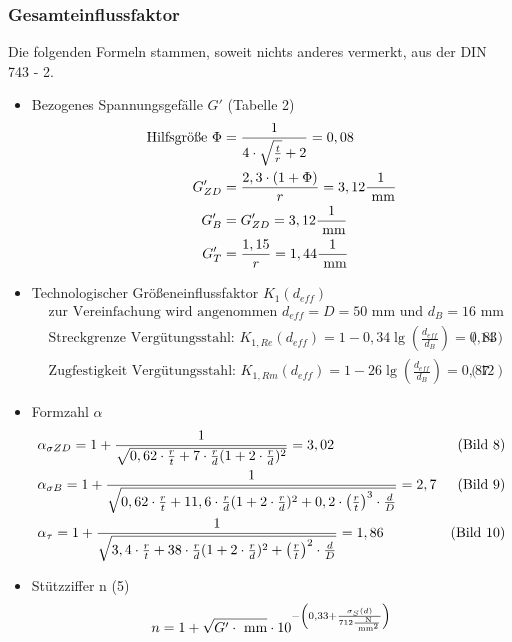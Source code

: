 \subsubsection{Gesamteinflussfaktor}
Die folgenden Formeln stammen, soweit nichts anderes vermerkt, aus der DIN 743 - 2.
\begin{itemize}
	\item Bezogenes Spannungsgefälle $G'$ \hfill (Tabelle 2)
	\begin{align*}
		\text{Hilfsgröße } \Phi &= \frac{1}{4 \cdot \sqrt{\frac{t}{r}} +2} = 0,08 \\
		G'_{ZD} &= \frac{2,3 \cdot (1+\Phi)}{r} = 3,12 \frac{1}{\text{ mm}} \\
		G'_{B}&= G'_{ZD}  =3,12 \frac{1}{\text{ mm}} \\
		G'_{T}&= \frac{1,15}{r} = 1,44\frac{1}{\text{ mm}} 
	\end{align*}
	\item Technologischer Größeneinflussfaktor $K_1 (d_{eff})$ 
	\begin{align*}
		&\text{zur Vereinfachung wird angenommen } d_{eff} = D =50 \text{ mm und } d_B = 16 \text{ mm} \\ 
		&\text{Streckgrenze Vergütungsstahl: }K_{1,Re}(d_{eff}) = 1 - 0,34 \lg \left( \frac{d_{eff}}{d_B} \right) = 0,83  &(14) \\
		&\text{Zugfestigkeit Vergütungsstahl: } K_{1,Rm}(d_{eff}) = 1 - 26 \lg \left( \frac{d_{eff}}{d_B} \right) = 0,87  &(12) 
	\end{align*}
	\item Formzahl $\alpha$
	\begin{align*}
		&\alpha_{\sigma ZD} = 1 + \frac{1}{\sqrt{0,62 \cdot \frac{r}{t} + 7 \cdot \frac{r}{d} (1+2 \cdot \frac{r}{d})^2}} = 3,02 & \text{(Bild 8)} \\
		&\alpha_{\sigma B} = 1 + \frac{1}{\sqrt{0,62 \cdot \frac{r}{t} + 11,6 \cdot \frac{r}{d} (1+2 \cdot \frac{r}{d})^2 + 0,2 \cdot \left( \frac{r}{t} \right) ^3 \cdot \frac{d}{D}}} = 2,7 & \text{(Bild 9)} \\
		&\alpha_{\tau} = 1 + \frac{1}{\sqrt{3,4 \cdot \frac{r}{t} + 38 \cdot \frac{r}{d} (1+2 \cdot \frac{r}{d})^2 + \left( \frac{r}{t} \right) ^2 \cdot \frac{d}{D}}} = 1,86 & \text{(Bild 10)} 
	\end{align*}
	\item Stützziffer n \hfill (5)
	\begin{align*}
		n&= 1 + \sqrt{G' \x \text{ mm}} \x 10 ^{-\left( 0,33 + \frac{\sigma_S (d)}{712\frac{\text{ N}}{\text{ mm}^2}} \right)} \\

\end{align*}
\end{itemize}

